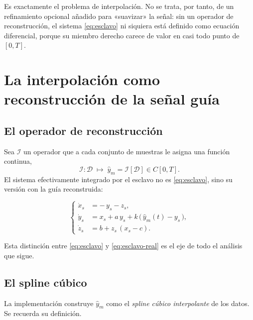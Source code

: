 \documentclass[12pt,a4paper]{article}
\begin{document}
Es exactamente el problema de interpolación. No se trata, por tanto, de un
refinamiento opcional añadido para «suavizar» la señal: sin un operador de
reconstrucción, el sistema \eqref{eq:esclavo} ni siquiera está definido como
ecuación diferencial, porque su miembro derecho carece de valor en casi todo punto
de $[0,T]$.

\section{La interpolación como reconstrucción de la señal guía}
\label{sec:interpolacion}

\subsection{El operador de reconstrucción}

Sea $\mathcal{I}$ un operador que a cada conjunto de muestras le asigna una función
continua,
\[
  \mathcal{I} : \mathcal{D} \;\longmapsto\; \hat{y}_m = \mathcal{I}[\mathcal{D}] \in C[0,T].
\]
El sistema efectivamente integrado por el esclavo no es \eqref{eq:esclavo}, sino
su versión con la guía reconstruida:

\begin{equation}
\label{eq:esclavo-real}
\left\{
\begin{aligned}
  \dot{x}_s &= -\,y_s - z_s,\\
  \dot{y}_s &= x_s + a\,y_s + k\,\bigl(\,\hat{y}_m(t) - y_s\,\bigr),\\
  \dot{z}_s &= b + z_s\,(x_s - c).
\end{aligned}
\right.
\end{equation}

Esta distinción entre \eqref{eq:esclavo} y \eqref{eq:esclavo-real} es el eje de
todo el análisis que sigue.

\subsection{El spline cúbico}

La implementación construye $\hat{y}_m$ como el \emph{spline cúbico interpolante}
de los datos. Se recuerda su definición.
\end{document}
